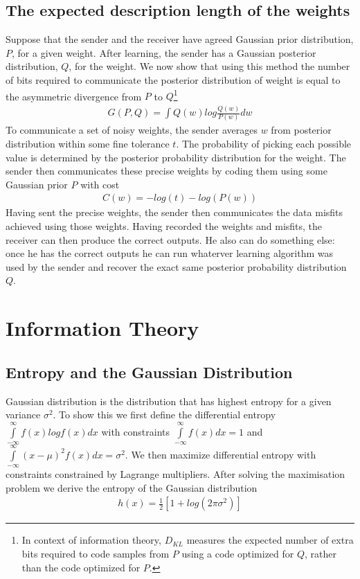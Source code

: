 \documentclass[../../main.tex]{subfiles}
\numberwithin{equation}{section}
\begin{document}
\subsection{The expected description length of the weights}
Suppose that the sender and the receiver have agreed Gaussian prior distribution, $P$, for a given weight. After learning, the sender has a Gaussian posterior distribution, $Q$, for the weight. We now show that using this method the number of bits required to communicate the posterior distribution of weight is equal to the asymmetric divergence from $P$ to $Q$\footnote{In context of information theory, $D_{KL}$ measures the expected number of extra bits required to code samples from $P$ using a code optimized for $Q$, rather than the code optimized for $P$.}
\begin{align}
    G(P, Q)=\int Q(w)log\frac{Q(w)}{P(w)}dw
\end{align}\label{eqn:kl-div-pq}
To communicate a set of noisy weights, the sender averages $w$ from posterior distribution within some fine tolerance $t$. The probability of picking each possible value is determined by the posterior probability distribution for the weight. The sender then communicates these precise weights by coding them using some Gaussian prior $P$ with cost
\begin{align}
    C(w)=-log(t)-log(P(w))
\end{align}
Having sent the precise weights, the sender then communicates the data misfits achieved using those weights. Having recorded the weights and misfits, the receiver can then produce the correct outputs. He also can do something else: once he has the correct outputs he can run whaterver learning algorithm was used by the sender and recover the exact same posterior probability distribution $Q$.

\section{Information Theory}
\subsection{Entropy and the Gaussian Distribution}
Gaussian distribution is the distribution that has highest entropy for a given variance $\sigma^2$. To show this we first define the differential entropy $\int\limits_{-\infty}^\infty f(x)logf(x)dx$ with constraints $\int\limits_{-\infty}^\infty f(x)dx=1$ and $\int\limits_{-\infty}^\infty (x-\mu)^2f(x)dx=\sigma^2$. We then maximize differential entropy with constraints constrained by Lagrange multipliers. After solving the maximisation problem we derive the entropy of the Gaussian distribution
\begin{align}
    h(x)=\frac{1}{2}[1 + log(2\pi\sigma^2)]
\end{align}\label{eqn:gauss-entropy}
\end{document}
